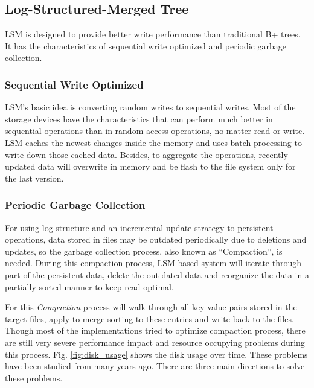 \subsection{Log-Structured-Merged Tree}\label{LSM-introduction}
LSM is designed to provide better write performance than traditional B+ trees. It has the characteristics of sequential write optimized and periodic garbage collection.

\subsubsection{Sequential Write Optimized} 
LSM's basic idea is converting random writes to sequential writes. Most of the storage devices have the characteristics that can perform much better in sequential operations than in random access operations, no matter read or write. LSM caches the newest changes inside the memory and uses batch processing to write down those cached data. Besides, to aggregate the operations, recently updated data will overwrite in memory and be flash to the file system only for the last version.
\subsubsection{Periodic Garbage Collection} 

For using log-structure and an incremental update strategy to persistent operations, data stored in files may be outdated periodically due to deletions and updates, so the garbage collection process, also known as ``Compaction'', is needed. During this compaction process, LSM-based system will iterate through part of the persistent data, delete the out-dated data and reorganize the data in a partially sorted manner to keep read optimal.

For this \textit{Compaction} process will walk through all key-value pairs stored in the target files, apply to merge sorting to these entries and write back to the files. Though most of the implementations tried to optimize compaction process, there are still very severe performance impact and resource occupying problems during this process. Fig. \ref{fig:disk_usage} shows the disk usage over time. These problems have been studied from many years ago. There are three main directions to solve these problems. 

